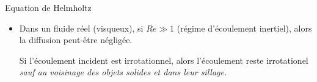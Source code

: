 \begin{frame}{Equation de Helmholtz}
\begin{itemize}
{\color{red} (Théorème de Laplace)}.

\pause

\item Dans un fluide réel (visqueux), si $Re  \gg 1$ (régime d'écoulement inertiel), alors la diffusion peut-être négligée.

Si l'écoulement incident est irrotationnel, alors l'écoulement reste irrotationel {\em sauf au voisinage des objets solides et dans leur sillage.}


\end{itemize}






\end{frame}

%


